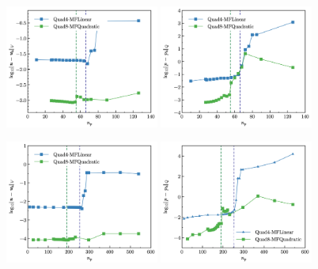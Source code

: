 \begin{figure}[H]
    \centering
    \begin{subcaptiongroup}
    \includegraphics[width=0.45\textwidth]{figures/ch_4/cantilever_4_L2_u.png}
    \label{cantilever_4_L2_u}
    \includegraphics[width=0.45\textwidth]{figures/ch_4/cantilever_4_L2_p.png}
    \label{cantilever_4_L2_p}
    \end{subcaptiongroup}
    \begin{subcaptiongroup}
    \includegraphics[width=0.45\textwidth]{figures/ch_4/cantilever_8_L2_u.png}
    \label{cantilever_8_L2_u}
    \includegraphics[width=0.45\textwidth]{figures/ch_4/cantilever_8_L2_p.png}

\end{subcaptiongroup}
\end{figure}
